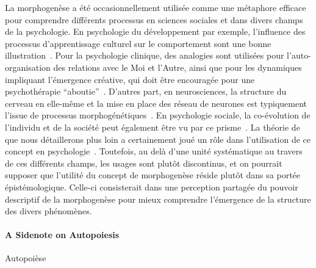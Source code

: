 {}{
La morphogenèse a été occasionnellement utilisée comme une métaphore efficace pour comprendre différents processus en sciences sociales et dans divers champs de la psychologie. En psychologie du développement par exemple, l'influence des processus d'apprentissage culturel sur le comportement sont une bonne illustration~\cite{hart_held_2013}. Pour la psychologie clinique, des analogies sont utilisées pour l'auto-organisation des relations avec le Moi et l'Autre, ainsi que pour les dynamiques impliquant l'émergence créative, qui doit être encouragée pour une psychothérapie ``aboutie''~\cite{piers_self-organizing_2007}. D'autres part, en neurosciences, la structure du cerveau en elle-même et la mise en place des réseau de neurones est typiquement l'issue de processus morphogénétiques~\cite{_issues_2013}. En psychologie sociale, la co-évolution de l'individu et de la société peut également être vu par ce prisme~\cite{archer_margaret_1999}. La théorie de  que nous détaillerons plus loin a certainement joué un rôle dans l'utilisation de ce concept en psychologie~\cite{de_luca_picione_processes_2016}. Toutefois, au delà d'une unité systématique au travers de ces différents champs, les usages sont plutôt discontinus, et on pourrait supposer que l'utilité du concept de morphogenèse réside plutôt dans sa portée épistémologique. Celle-ci consisterait dans une perception partagée du pouvoir descriptif de la morphogenèse pour mieux comprendre l'émergence de la structure des divers phénomènes.
}

\paragraph{A Sidenote on Autopoiesis}{Autopoièse}


